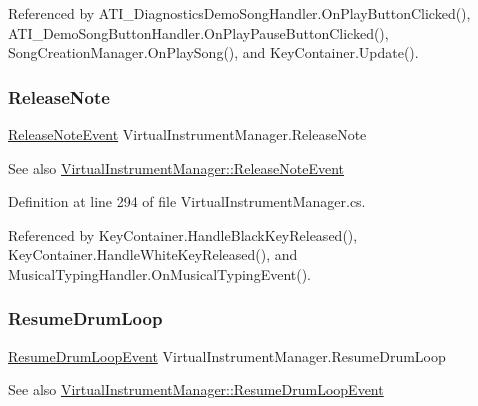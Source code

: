 Referenced by A\+T\+I\+\_\+\+Diagnostics\+Demo\+Song\+Handler.\+On\+Play\+Button\+Clicked(), A\+T\+I\+\_\+\+Demo\+Song\+Button\+Handler.\+On\+Play\+Pause\+Button\+Clicked(), Song\+Creation\+Manager.\+On\+Play\+Song(), and Key\+Container.\+Update().

\mbox{\label{group___v_i_m_events_ga3a1726a6366126421434c2c7be5e5678}} 
\subsubsection{\texorpdfstring{Release\+Note}{ReleaseNote}}
{\footnotesize\ttfamily \hyperlink{group___v_i_m_event_types_class_virtual_instrument_manager_1_1_release_note_event}{Release\+Note\+Event} Virtual\+Instrument\+Manager.\+Release\+Note}

\begin{DoxySeeAlso}{See also}
\hyperlink{group___v_i_m_event_types_class_virtual_instrument_manager_1_1_release_note_event}{Virtual\+Instrument\+Manager\+::\+Release\+Note\+Event} 
\end{DoxySeeAlso}


Definition at line 294 of file Virtual\+Instrument\+Manager.\+cs.



Referenced by Key\+Container.\+Handle\+Black\+Key\+Released(), Key\+Container.\+Handle\+White\+Key\+Released(), and Musical\+Typing\+Handler.\+On\+Musical\+Typing\+Event().

\mbox{\label{group___v_i_m_events_ga54db2dc24076cd3cd130e95c2fd5bea0}} 
\subsubsection{\texorpdfstring{Resume\+Drum\+Loop}{ResumeDrumLoop}}
{\footnotesize\ttfamily \hyperlink{group___v_i_m_event_types_class_virtual_instrument_manager_1_1_resume_drum_loop_event}{Resume\+Drum\+Loop\+Event} Virtual\+Instrument\+Manager.\+Resume\+Drum\+Loop}

\begin{DoxySeeAlso}{See also}
\hyperlink{group___v_i_m_event_types_class_virtual_instrument_manager_1_1_resume_drum_loop_event}{Virtual\+Instrument\+Manager\+::\+Resume\+Drum\+Loop\+Event} 
\end{DoxySeeAlso}


